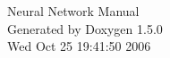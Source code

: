 \documentclass[a4paper]{article}
\begin{document}
\begin{titlepage}
\vspace*{7cm}
\begin{center}
{\Large Neural Network Manual}\\
\vspace*{1cm}
{\large Generated by Doxygen 1.5.0}\\
\vspace*{0.5cm}
{\small Wed Oct 25 19:41:50 2006}\\
\end{center}
\end{titlepage}
\clearemptydoublepage


\tableofcontents
\clearemptydoublepage





\printindex
\end{document}

